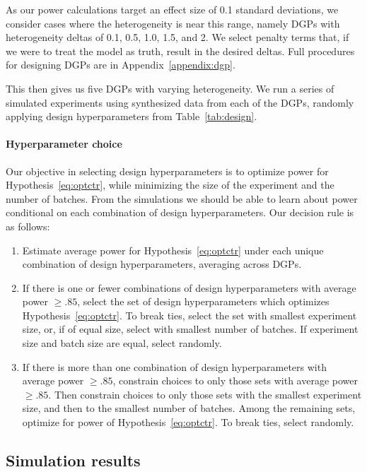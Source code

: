 \documentclass[letterpaper, 12pt, parskip=full,DIV=10]{scrartcl}
\begin{document}
 {As our power calculations target an effect size of 0.1 standard deviations, we consider cases where the heterogeneity is near this range, namely DGPs with heterogeneity deltas of 0.1, 0.5, 1.0, 1.5, and 2.} We select penalty terms that, if we were to treat the model as truth, result in the desired deltas. Full procedures for designing DGPs are in Appendix~\ref{appendix:dgp}. 

This then gives us five DGPs with varying heterogeneity. We run a series of simulated experiments using synthesized data from each of the DGPs, randomly applying design hyperparameters from Table~\ref{tab:design}. 

\paragraph{Hyperparameter choice}

Our objective in selecting design hyperparameters is to optimize power for Hypothesis~\ref{eq:optctr}, while minimizing the size of the experiment and the number of batches. From the simulations we should be able to learn about power conditional on each combination of design hyperparameters. Our decision rule is as follows:
\begin{enumerate}
\item Estimate average power for Hypothesis~\ref{eq:optctr} under each unique combination of design hyperparameters, averaging across DGPs. 
\item If there is one or fewer combinations of design hyperparameters with average power $\ge.85$, select the set of design hyperparameters which optimizes Hypothesis~\ref{eq:optctr}. To break ties, select the set with smallest experiment size, or, if of equal size, select with smallest number of batches. If experiment size and batch size are equal, select randomly. 
\item If there is more than one combination of design hyperparameters with average power $\ge.85$, constrain choices to only those sets with average power $\ge.85$. Then constrain choices to only those sets with the smallest experiment size, and then to the smallest number of batches. Among the remaining sets, optimize for power of Hypothesis~\ref{eq:optctr}. To break ties, select randomly. 
\end{enumerate}


\subsection{Simulation results}
\end{document}
